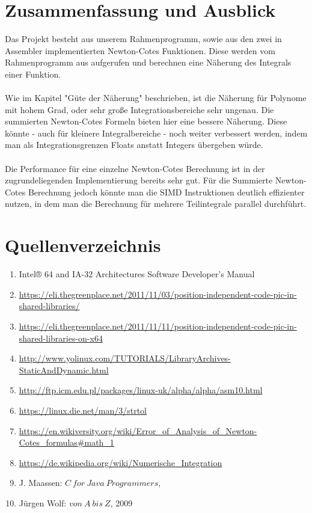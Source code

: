 \documentclass[course=erap]{aspdoc}
\begin{document}
\section{Zusammenfassung und Ausblick}
Das Projekt besteht aus unserem Rahmenprogramm,  sowie aus den zwei in Assembler implementierten Newton-Cotes Funktionen. Diese werden vom Rahmenprogramm aus aufgerufen und berechnen eine Näherung des Integrals einer Funktion.\\\\
Wie im Kapitel "Güte der Näherung"  beschrieben, ist die Näherung für Polynome mit hohem Grad, oder sehr große Integrationsbereiche sehr ungenau. Die summierten Newton-Cotes Formeln bieten hier eine bessere Näherung. Diese könnte - auch für kleinere Integralbereiche - noch weiter verbessert werden, indem man als Integrationsgrenzen Floats anstatt Integers übergeben würde.\\\\
Die Performance für eine einzelne Newton-Cotes Berechnung ist in der zugrundeliegenden Implementierung bereits sehr gut. Für die Summierte Newton-Cotes Berechnung jedoch könnte man die SIMD Instruktionen deutlich effizienter nutzen, in dem man die Berechnung für mehrere Teilintegrale parallel durchführt.\\

\section{Quellenverzeichnis}
\begin{footnotesize}
\begin{enumerate}
\item Intel® 64 and IA-32 Architectures Software Developer’s Manual
\item \hypertarget{link1} {\url{https://eli.thegreenplace.net/2011/11/03/position-independent-code-pic-in-shared-libraries/}}
\item \url{https://eli.thegreenplace.net/2011/11/11/position-independent-code-pic-in-shared-libraries-on-x64}
\item \url{http://www.yolinux.com/TUTORIALS/LibraryArchives-StaticAndDynamic.html}
\item \url{http://ftp.icm.edu.pl/packages/linux-uk/alpha/alpha/asm10.html}
\item \url{https://linux.die.net/man/3/strtol}
\item \url{https://en.wikiversity.org/wiki/Error_of_Analysis_of_Newton-Cotes_formulas#math_1}
\item \url{https://de.wikipedia.org/wiki/Numerische_Integration}
\item J. Maassen: $C\ for\ Java\ Programmers$, 
\item Jürgen Wolf:  $von\ A\ bis\ Z$, 2009
\end{enumerate}
\end{footnotesize}
\end{document}
